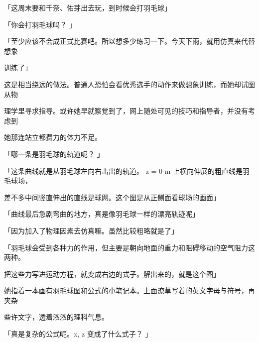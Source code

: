 「这周末要和千奈、佑芽出去玩，到时候会打羽毛球」\par
「你会打羽毛球吗？ 」\par
「至少应该不会成正式比赛吧。所以想多少练习一下。今天下雨，就用仿真来代替想象\par
训练了」\par
这是相当绕远的做法。普通人恐怕会看优秀选手的动作来做想象训练，而她却试图从物\par
理学里寻求指导。或许她早就察觉到了，网上随处可见的技巧和指导者，并没有考虑到\par
她那连站立都费力的体力不足。\par
「哪一条是羽毛球的轨道呢？ 」\par
「这条曲线就是从羽毛球左向右击出的轨道。 z = 0 m 上横向伸展的粗直线是羽毛球场，\par
差不多中间竖直伸出的直线是球网。这个图是从正侧面看球场的画面」\par
「曲线最后急剧弯曲的地方，真是像羽毛球一样的漂亮轨迹呢」\par
「因为加入了物理因素去仿真嘛。虽然比较粗略就是了」\par
「羽毛球会受到各种力的作用，但主要是朝向地面的重力和阻碍移动的空气阻力这两种。\par
把这些力写进运动方程，就变成右边的式子。解出来的，就是这个图」\par
她指着一本画有羽毛球图和公式的小笔记本。上面潦草写着的英文字母与符号，再夹杂\par
些许文字，透着浓浓的理科气息。\par
「真是复杂的公式呢。x, z 变成了什么式子？ 」\par

